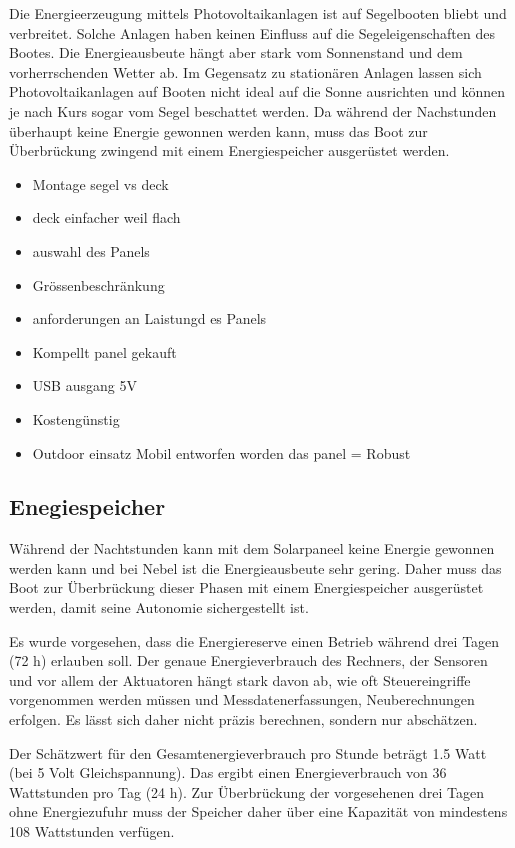 Die Energieerzeugung mittels Photovoltaikanlagen ist auf Segelbooten bliebt und verbreitet. Solche Anlagen haben keinen Einfluss auf die Segeleigenschaften des Bootes. Die Energieausbeute hängt aber stark vom Sonnenstand und dem vorherrschenden Wetter ab. Im Gegensatz zu stationären Anlagen lassen sich Photovoltaikanlagen auf Booten nicht ideal auf die Sonne ausrichten und können je nach Kurs sogar vom Segel beschattet werden. Da während der Nachstunden überhaupt keine Energie gewonnen werden kann, muss das Boot zur Überbrückung zwingend mit einem Energiespeicher ausgerüstet werden.

\begin{itemize}
    \item Montage segel vs deck
    \item deck einfacher weil flach
    \item auswahl des Panels
    \item Grössenbeschränkung
    \item anforderungen an Laistungd es Panels
    \item Kompellt panel gekauft
    \item USB ausgang 5V
    \item Kostengünstig
    \item Outdoor einsatz Mobil entworfen worden das panel = Robust


\end{itemize}

\subsection{Enegiespeicher}
Während der Nachtstunden kann mit dem Solarpaneel keine Energie gewonnen werden kann und bei Nebel ist die Energieausbeute sehr gering. Daher muss das Boot zur Überbrückung dieser Phasen mit einem Energiespeicher ausgerüstet werden, damit seine Autonomie sichergestellt ist.

Es wurde vorgesehen, dass die Energiereserve einen Betrieb während drei Tagen (72 h) erlauben soll. Der genaue Energieverbrauch des Rechners, der Sensoren und vor allem der Aktuatoren hängt stark davon ab, wie oft Steuereingriffe vorgenommen werden müssen und Messdatenerfassungen, Neuberechnungen erfolgen. Es lässt sich daher nicht präzis berechnen, sondern nur abschätzen. 

Der Schätzwert für den Gesamtenergieverbrauch pro Stunde beträgt 1.5 Watt (bei 5 Volt Gleichspannung). Das ergibt einen Energieverbrauch von 36 Wattstunden pro Tag (24 h). Zur Überbrückung der vorgesehenen drei Tagen ohne Energiezufuhr muss der Speicher daher über eine Kapazität von mindestens 108 Wattstunden verfügen. 

